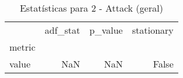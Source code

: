\begin{table}[htbp]
\caption{Estatísticas para 2 - Attack (geral)}
\label{tab:2_-_attack_(geral)_adf_test}
\begin{tabular}{lrrr}
\toprule
 & adf_stat & p_value & stationary \\
metric &  &  &  \\
\midrule
value & NaN & NaN & False \\
\bottomrule
\end{tabular}
\end{table}
